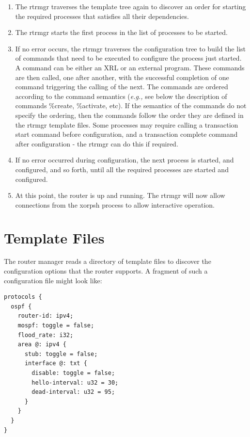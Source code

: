 \documentclass[11pt]{article}
\newcommand{\eg}{\emph{e.g.,}\xspace}
\begin{document}
\begin{enumerate}
  \item The rtrmgr traverses the template tree again to discover an order for
  starting the required processes that satisfies all their dependencies.

  \item The rtrmgr starts the first process in the list of processes to be
  started.

  \item If no error occurs, the rtrmgr traverses the configuration tree to
  build the list of commands that need to be executed to configure the process
  just started.  A command can be either an XRL or an external program.
  These commands are then called, one after another, with the
  successful completion of one command triggering the calling of the next.
  The commands are ordered according to the command semantics
  (\eg see below the description of commands
  \%create, \%activate, etc). If the semantics of the commands
  do not specify the ordering, then the commands follow the order they
  are defined in the rtrmgr template files.
  Some processes may require calling a transaction start command before
  configuration, and a transaction complete command after configuration -
  the rtrmgr can do this if required.

  \item If no error occurred during configuration, the next process is started,
  and configured, and so forth, until all the required processes are
  started and configured.

  \item At this point, the router is up and running.  The rtrmgr will now
  allow connections from the xorpsh process to allow interactive
  operation.

\end{enumerate}

\newpage

\section{Template Files}

The router manager reads a directory of template files to discover the
configuration options that the router supports.  A fragment of such a
configuration file might look like:

\begin{verbatim}
protocols {
  ospf {
    router-id: ipv4;
    mospf: toggle = false;
    flood_rate: i32;
    area @: ipv4 {
      stub: toggle = false;
      interface @: txt {
        disable: toggle = false;
        hello-interval: u32 = 30;
        dead-interval: u32 = 95;
      }
    }
  }
}
\end{verbatim}
\end{document}
